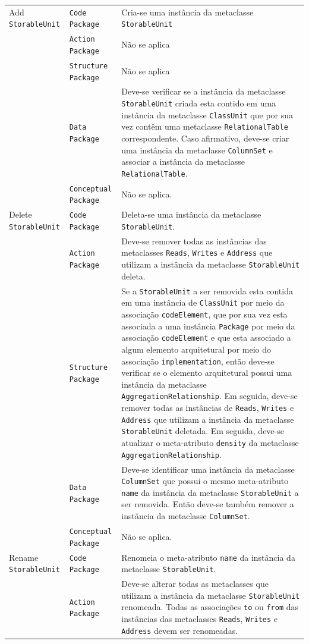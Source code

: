 \begin{longtable}{ | m{1.9cm} | m{3.57cm}| m{9.3cm} | }
 Add \texttt{StorableUnit} & \texttt{Code Package} & Cria-se uma instância da metaclasse \texttt{StorableUnit}\tabularnewline
\cline{2-3} 
\cline{2-3} 
 & \texttt{Action Package} & Não se aplica \tabularnewline
 \cline{2-3} 
 & \texttt{Structure Package} & Não se aplica \tabularnewline
\cline{2-3} 
 & \texttt{Data Package} & Deve-se verificar se a instância da metaclasse \texttt{StorableUnit} criada esta contido em uma instância da metaclasse \texttt{ClassUnit} que por sua vez contêm uma metaclasse \texttt{RelationalTable} correspondente. Caso afirmativo, deve-se criar uma instância da metaclasse \texttt{ColumnSet} e associar a instância da metaclasse \texttt{RelationalTable}. \tabularnewline
\cline{2-3} 
 & \texttt{Conceptual Package} & Não se aplica. \tabularnewline
\hline 
 Delete \texttt{StorableUnit} & \texttt{Code Package} & Deleta-se uma instância da metaclasse \texttt{StorableUnit}.\tabularnewline
\cline{2-3} 
& \texttt{Action Package} & Deve-se remover todas as instâncias das metaclasses \texttt{Reads}, \texttt{Writes} e \texttt{Address} que utilizam a instância da metaclasse \texttt{StorableUnit} deleta. \tabularnewline
\cline{2-3}
& \texttt{Structure Package} & Se a \texttt{StorableUnit} a ser removida esta contida em uma instância de \texttt{ClassUnit} por meio da associação \texttt{codeElement}, que por sua vez esta associada a uma instância \texttt{Package} por meio da associação \texttt{codeElement} e que esta associado a algum elemento arquitetural por meio do associação \texttt{implementation}, então deve-se verificar se o elemento arquitetural possui uma instância da metaclasse \texttt{AggregationRelationship}. Em seguida, deve-se remover todas as instâncias de \texttt{Reads}, \texttt{Writes} e \texttt{Address} que utilizam a instância da metaclasse \texttt{StorableUnit} deletada. Em seguida, deve-se atualizar o meta-atributo \texttt{density} da metaclasse \texttt{AggregationRelationship}. \tabularnewline
\cline{2-3}
& \texttt{Data Package} & Deve-se identificar uma instância da metaclasse \texttt{ColumnSet} que possui o mesmo meta-atributo \texttt{name} da instância da metaclasse \texttt{StorableUnit} a ser removida. Então deve-se também remover a instância da metaclasse \texttt{ColumnSet}. \tabularnewline
\cline{2-3}
& \texttt{Conceptual Package} & Não se aplica. \tabularnewline
\hline
Rename \texttt{StorableUnit} & \texttt{Code Package} & Renomeia o meta-atributo \texttt{name} da instância da metaclasse \texttt{StorableUnit}.\tabularnewline
\cline{2-3}
& \texttt{Action Package} & Deve-se alterar todas as metaclasses que utilizam a instância da metaclasse \texttt{StorableUnit} renomeada. Todas as associações \texttt{to} ou \texttt{from} das instâncias das metaclasses \texttt{Reads}, \texttt{Writes} e \texttt{Address} devem ser renomeadas. \tabularnewline

\end{longtable}
